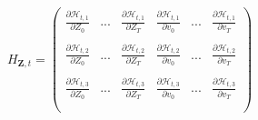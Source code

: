 \documentclass[titlepage]{\econtex}\providecommand{\texname}{BufferStockTheory}
\begin{document}
  $$ H_{\mathbf{Z}, t}= \begin{pmatrix} 
\frac{ \partial \mathcal{H}_{t,1}}{\partial Z_{0}}  & ... & \frac{ \partial \mathcal{H}_{t,1}}{\partial Z_{T}} & \frac{ \partial \mathcal{H}_{t,1}}{\partial v_{0}} & ... & \frac{ \partial \mathcal{H}_{t,1}}{\partial v_{T}} \\ \\ 
\frac{ \partial \mathcal{H}_{t,2}}{\partial Z_{0}}  & ... & \frac{ \partial \mathcal{H}_{t,2}}{\partial Z_{T}} & \frac{ \partial \mathcal{H}_{t,2}}{\partial v_{0}} & ... & \frac{ \partial \mathcal{H}_{t,2}}{\partial v_{T}} \\ \\
\frac{ \partial \mathcal{H}_{t,3}}{\partial Z_{0}}  & ... & \frac{ \partial \mathcal{H}_{t,3}}{\partial Z_{T}} & \frac{ \partial \mathcal{H}_{t,3}}{\partial v_{0}} & ... & \frac{ \partial \mathcal{H}_{t,3}}{\partial v_{T}}  \\ \\
 \end{pmatrix} $$
 
 


\end{document}
